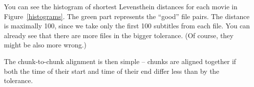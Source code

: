 You can see the histogram of shortest Levensthein distances for each movie in Figure~\ref{histograms}. The green part represents the ``good'' file pairs. The distance is maximally 100, since we take only the first 100 subtitles from each file. You can already see that there are more files in the bigger tolerance. (Of course, they might be also more wrong.)


%
%

The chunk-to-chunk alignment is then simple -- chunks are aligned together if both the time of their start and time of their end differ less than by the tolerance.


